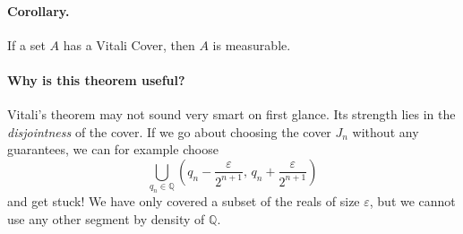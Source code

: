 \paragraph{Corollary.} If a set \( A \) has a Vitali Cover, then \( A \) is measurable. 

\paragraph{Why is this theorem useful?} Vitali's theorem may not sound very smart on first glance. Its strength lies in the \emph{disjointness} of the cover. If we go about choosing the cover \( J_n \) without any guarantees, we can for example choose
\[ 
    \bigcup_{q_n \in \mathbb{Q}} \left(q_n - \frac{\varepsilon}{2^{n+1}},\,q_n + \frac{\varepsilon }{2^{n+1}}\right) 
\]
and get stuck! We have only covered a subset of the reals of size \(\varepsilon \), but we cannot use any other segment by density of \( \mathbb{Q} \).
